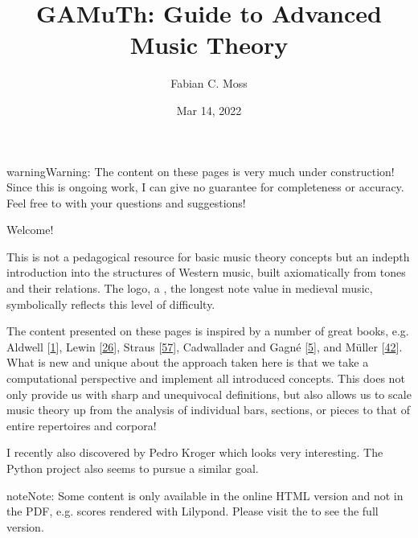 \documentclass[letterpaper,10pt,english]{sphinxmanual}
\title{GAMuTh: Guide to Advanced Music Theory}
\date{Mar 14, 2022}
\author{Fabian C.\@{} Moss}
\begin{document}
\pagestyle{empty}
\sphinxmaketitle
\pagestyle{plain}
\sphinxtableofcontents
\pagestyle{normal}
\label{\detokenize{index::doc}}


\begin{sphinxadmonition}{warning}{Warning:}
\sphinxAtStartPar
The content on these pages is very much under construction!
Since this is ongoing work, I can give no guarantee for completeness or accuracy.
Feel free to  with your questions and suggestions!
\end{sphinxadmonition}

\sphinxAtStartPar
Welcome!

\sphinxAtStartPar
This is not a pedagogical resource for basic music theory concepts
but an in\sphinxhyphen{}depth introduction into the structures of Western music,
built axiomatically from tones and their relations.
The logo, a , the longest note value in medieval music,
symbolically reflects this level of difficulty.

\sphinxAtStartPar
The content presented on these pages is inspired by a number of great books, e.g.
Aldwell  {[}\hyperlink{cite.8_bibliography:id12}{1}{]}, Lewin {[}\hyperlink{cite.8_bibliography:id2}{26}{]}, Straus {[}\hyperlink{cite.8_bibliography:id3}{57}{]},
Cadwallader and Gagné {[}\hyperlink{cite.8_bibliography:id18}{5}{]}, and Müller {[}\hyperlink{cite.8_bibliography:id24}{42}{]}.
What is new and unique about the approach taken here is that we take
a computational perspective and implement all introduced concepts.
This does not only provide us with sharp and unequivocal definitions,
but also allows us to scale music theory up from the analysis of individual
bars, sections, or pieces to that of entire repertoires and corpora!

\sphinxAtStartPar
I recently also discovered  by Pedro Kroger
which looks very interesting.
The Python project  also seems to pursue a similar goal.

\begin{sphinxadmonition}{note}{Note:}
\sphinxAtStartPar
Some content is only available in the online HTML version and not in the PDF,
e.g. scores rendered with Lilypond. Please visit the  to see the full version.
\end{sphinxadmonition}
\end{document}
